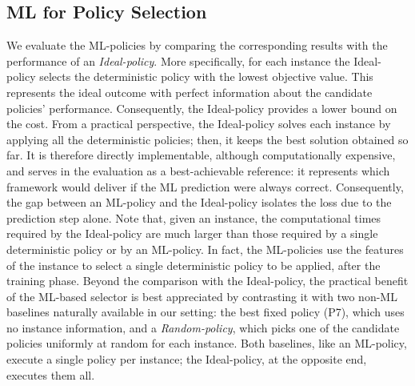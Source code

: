 \documentclass[preprint,11pt,authoryear]{elsarticle}
\begin{document}
\subsection{ML for Policy Selection} \label{mlpolicies}

We evaluate the ML-policies by comparing the corresponding results with the performance of an 
\textit{Ideal-policy}. 
More specifically, for each instance the Ideal-policy selects the deterministic policy with the lowest objective value. This represents the ideal outcome with perfect information about the candidate policies' performance. Consequently, the Ideal-policy provides a lower bound on the cost. From a practical perspective, the Ideal-policy solves each instance by applying all the deterministic policies; then, it keeps the best solution obtained so far. 
%
It is therefore directly implementable, although computationally expensive, and serves in the evaluation as a best-achievable reference: it represents which framework would deliver if the ML prediction were always correct. Consequently, the gap between an ML-policy and the Ideal-policy isolates the loss due to the prediction step alone.
Note that, given an instance, the computational times required by the Ideal-policy are much larger than those required by a single deterministic policy or by an ML-policy. In fact, the ML-policies use the features of the instance to select a single deterministic policy to be applied, after the training phase.  
Beyond the comparison with the Ideal-policy, the practical benefit of the ML-based selector is best appreciated by contrasting it with two non-ML baselines naturally available in our setting: the best fixed policy (P7), which uses no instance information, and a \textit{Random-policy}, which picks one of the candidate policies uniformly at random for each instance. Both baselines, like an ML-policy, execute a single policy per instance; the Ideal-policy, at the opposite end, executes them all.
\end{document}
